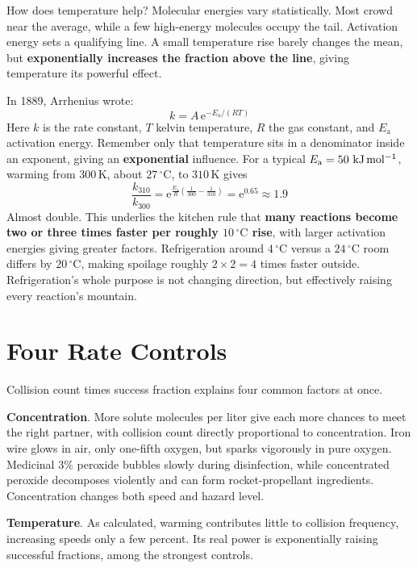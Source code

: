 How does temperature help? Molecular energies vary statistically. Most crowd near the average, while a few high-energy molecules occupy the tail. Activation energy sets a qualifying line. A small temperature rise barely changes the mean, but \textbf{exponentially increases the fraction above the line}, giving temperature its powerful effect.

\begin{qiaoliang}
In 1889, Arrhenius wrote:
\[k = A\,\mathrm{e}^{-E_{\mathrm{a}}/(RT)}\]
Here $k$ is the rate constant, $T$ kelvin temperature, $R$ the gas constant, and $E_{\mathrm{a}}$ activation energy. Remember only that temperature sits in a denominator inside an exponent, giving an \textbf{exponential} influence. For a typical $E_{\mathrm{a}} = 50\ \mathrm{kJ\,mol^{-1}}$, warming from $300\,\mathrm{K}$, about $27\,^{\circ}\mathrm{C}$, to $310\,\mathrm{K}$ gives
\[\frac{k_{310}}{k_{300}} = \mathrm{e}^{\frac{E_{\mathrm{a}}}{R}\left(\frac{1}{300}-\frac{1}{310}\right)} = \mathrm{e}^{0.65} \approx 1.9\]
Almost double. This underlies the kitchen rule that \textbf{many reactions become two or three times faster per roughly $10\,^{\circ}\mathrm{C}$ rise}, with larger activation energies giving greater factors. Refrigeration around $4\,^{\circ}\mathrm{C}$ versus a $24\,^{\circ}\mathrm{C}$ room differs by $20\,^{\circ}\mathrm{C}$, making spoilage roughly $2\times 2=4$ times faster outside. Refrigeration's whole purpose is not changing direction, but effectively raising every reaction's mountain.
\end{qiaoliang}

\section{Four Rate Controls}

Collision count times success fraction explains four common factors at once.

\textbf{Concentration}. More solute molecules per liter give each more chances to meet the right partner, with collision count directly proportional to concentration. Iron wire glows in air, only one-fifth oxygen, but sparks vigorously in pure oxygen. Medicinal $3\%$ peroxide bubbles slowly during disinfection, while concentrated peroxide decomposes violently and can form rocket-propellant ingredients. Concentration changes both speed and hazard level.

\textbf{Temperature}. As calculated, warming contributes little to collision frequency, increasing speeds only a few percent. Its real power is exponentially raising successful fractions, among the strongest controls.

